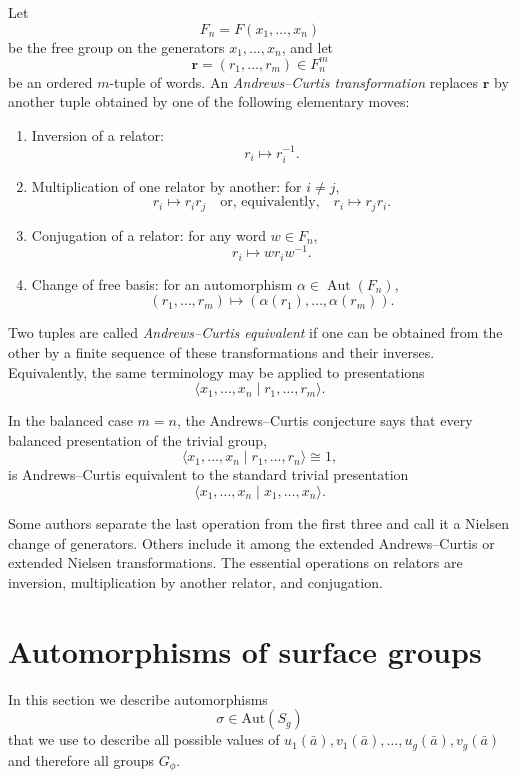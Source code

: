 \documentclass{article}
\begin{document}
Let
\[
F_n=F(x_1,\dots,x_n)
\]
be the free group on the generators $x_1,\dots,x_n$, and let
\[
\mathbf r=(r_1,\dots,r_m)\in F_n^m
\]
be an ordered $m$-tuple of words.  An \emph{Andrews--Curtis transformation}
replaces $\mathbf r$ by another tuple obtained by one of the following elementary
moves:

\begin{enumerate}
    \item {Inversion of a relator:}
    \[
    r_i \longmapsto r_i^{-1}.
    \]

    \item {Multiplication of one relator by another:}
    for $i\neq j$,
    \[
    r_i \longmapsto r_i r_j
    \quad\text{or, equivalently,}\quad
    r_i \longmapsto r_j r_i.
    \]

    \item {Conjugation of a relator:}
    for any word $w\in F_n$,
    \[
    r_i \longmapsto w r_i w^{-1}.
    \]

    \item {Change of free basis:}
    for an automorphism $\alpha\in \operatorname{Aut}(F_n)$,
    \[
    (r_1,
    \dots,r_m)
    \longmapsto
    (\alpha(r_1),\dots,\alpha(r_m)).
    \]
\end{enumerate}

Two tuples are called \emph{Andrews--Curtis equivalent} if one can be obtained
from the other by a finite sequence of these transformations and their inverses.
Equivalently, the same terminology may be applied to presentations
\[
\langle x_1,\dots,x_n \mid r_1,
\dots,r_m\rangle .
\]

In the balanced case $m=n$, the Andrews--Curtis conjecture says that every
balanced presentation of the trivial group,
\[
\langle x_1,\dots,x_n \mid r_1,
\dots,r_n\rangle \cong 1,
\]
is Andrews--Curtis equivalent to the standard trivial presentation
\[
\langle x_1,\dots,x_n \mid x_1,
\dots,x_n\rangle .
\]

Some authors separate the last operation from the first three and call it a
Nielsen change of generators.  Others include it among the extended
Andrews--Curtis or extended Nielsen transformations.  The essential operations
on relators are inversion, multiplication by another relator, and conjugation.


\section {Automorphisms of surface groups}\label{Autom}
In this section we describe automorphisms
\[
\sigma\in \mathrm{Aut}(S_g) 
\] that we use to  describe all possible values of 
$u_1(\bar a),v_1(\bar a),\ldots ,u_g(\bar a),v_g(\bar a)$  and therefore all groups $G_{\phi}.$
\end{document}
